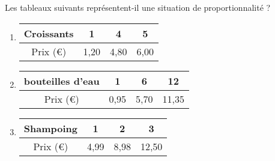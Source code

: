 
Les tableaux suivants représentent-il une situation de proportionnalité ?

\begin{enumerate}
\item 

\begin{center}
\begin{tabular}{|c|c|c|c|}
\hline 
Croissants & 1 & 4 & 5 \\ 
\hline 
Prix (€) & 1,20 & 4,80 & 6,00 \\ 
\hline 
\end{tabular} 
\end{center}

\item
 
\begin{center}
\begin{tabular}{|c|c|c|c|}
\hline 
bouteilles d'eau & 1 & 6 & 12\\ 
\hline 
Prix (€) & 0,95 & 5,70 & 11,35 \\ 
\hline 
\end{tabular} 
\end{center}

\item
 
\begin{center}
\begin{tabular}{|c|c|c|c|}
\hline 
Shampoing & 1 & 2 & 3\\ 
\hline 
Prix (€) & 4,99 & 8,98 & 12,50 \\ 
\hline 
\end{tabular} 
\end{center}

\end{enumerate}